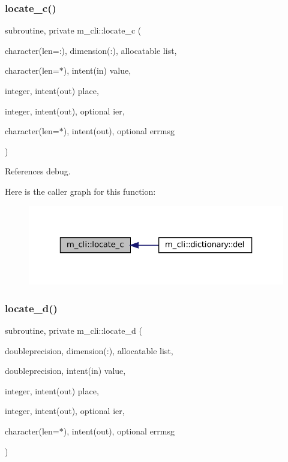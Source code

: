 \subsubsection{\texorpdfstring{locate\+\_\+c()}{locate\_c()}}
{\footnotesize\ttfamily subroutine, private m\+\_\+cli\+::locate\+\_\+c (\begin{DoxyParamCaption}\item[{character(len=\+:), dimension(\+:), allocatable}]{list,  }\item[{character(len=$\ast$), intent(in)}]{value,  }\item[{integer, intent(out)}]{place,  }\item[{integer, intent(out), optional}]{ier,  }\item[{character(len=$\ast$), intent(out), optional}]{errmsg }\end{DoxyParamCaption})\hspace{0.3cm}{\ttfamily [private]}}



References debug.

Here is the caller graph for this function\+:\nopagebreak
\begin{figure}[H]
\begin{center}
\leavevmode
\includegraphics[width=323pt]{namespacem__cli_ade3d1e36f0fc6a47b5469dcd8ade5312_icgraph}
\end{center}
\end{figure}
\mbox{\label{namespacem__cli_a4187c24a2abf5cc630232965637493e8}} 
\subsubsection{\texorpdfstring{locate\+\_\+d()}{locate\_d()}}
{\footnotesize\ttfamily subroutine, private m\+\_\+cli\+::locate\+\_\+d (\begin{DoxyParamCaption}\item[{doubleprecision, dimension(\+:), allocatable}]{list,  }\item[{doubleprecision, intent(in)}]{value,  }\item[{integer, intent(out)}]{place,  }\item[{integer, intent(out), optional}]{ier,  }\item[{character(len=$\ast$), intent(out), optional}]{errmsg }\end{DoxyParamCaption})\hspace{0.3cm}{\ttfamily [private]}}



